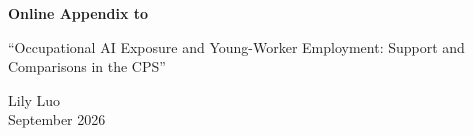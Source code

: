 \documentclass[12pt,letterpaper]{article}
\begin{document}
\begin{center}
  {\Large\bfseries Online Appendix to\par}
  \vspace{0.6em}
  {\large ``Occupational AI Exposure and Young-Worker Employment: Support and Comparisons in the CPS''\par}
  \vspace{0.8em}
  Lily Luo\\[0.25em]
  September 2026
\end{center}
\vspace{1em}
\tableofcontents
\clearpage
\appendix











\end{document}
